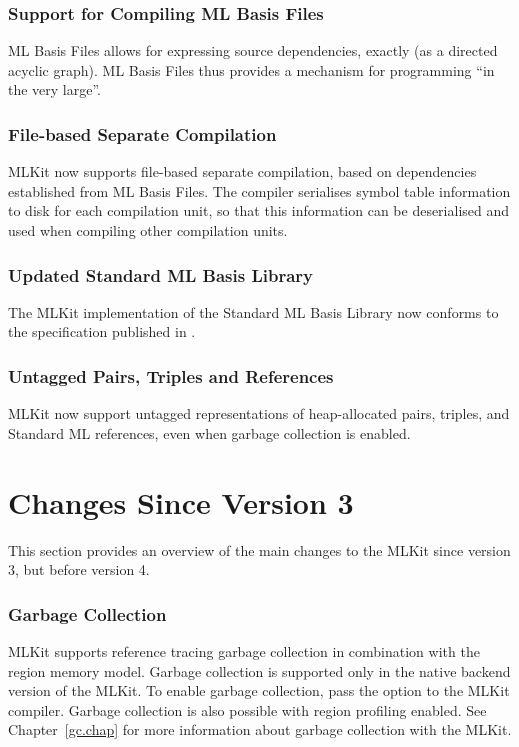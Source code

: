 \documentclass[12pt]{book}
\begin{document}
\subsubsection*{Support for Compiling ML Basis Files}
%
%
ML Basis Files allows for expressing source dependencies, exactly (as a directed
acyclic graph). ML Basis Files thus provides a mechanism for programming ``in
the very large''.

\subsubsection*{File-based Separate Compilation}
%
%
MLKit now supports file-based separate compilation, based on dependencies
established from ML Basis Files. The compiler serialises symbol table
information to disk for each compilation unit, so that this information can be
deserialised and used when compiling other compilation units.

\subsubsection*{Updated Standard ML Basis Library}
%
%
%
The MLKit implementation of the Standard ML Basis Library now conforms to the
specification published in \cite{basislib2004}.

\subsubsection*{Untagged Pairs, Triples and References}
%
%
%
%
%
MLKit now support untagged representations of heap-allocated pairs, triples,
and Standard ML references, even when garbage collection is enabled.

\section{Changes Since Version 3}
%
%
This section provides an overview of the main changes to the MLKit since version
3, but before version 4.

\subsubsection*{Garbage Collection}
%
%
MLKit supports reference tracing garbage collection in combination with the
region memory model. Garbage collection is supported only in the native backend
version of the MLKit. To enable garbage collection, pass the option  to
the MLKit compiler. Garbage collection is also possible with region profiling
enabled. See Chapter~\ref{gc.chap} for more information about garbage collection
with the MLKit.
\end{document}

